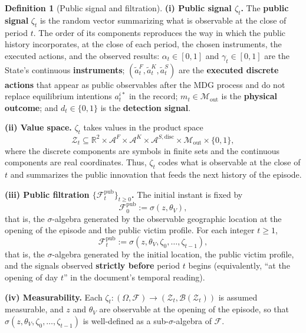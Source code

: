 \documentclass[12pt,a4paper]{article}
\theoremstyle{plain}
\theoremstyle{definition}
\newtheorem{definition}[theorem]{Definition}
\theoremstyle{remark}
\newcommand{\1}{\mathbf{1}}
\begin{document}
\begin{definition}[Public signal and filtration]
\label{def:zeta-filtration}
\noindent\textbf{\textup{(i)} Public signal $\zeta_t$.}\quad
The \textbf{public signal} $\zeta_t$ is the random vector summarizing what is observable
at the close of period $t$. The order of its components reproduces the way in which the
public history incorporates, at the close of each period, the chosen instruments, the
executed actions, and the observed results: $\alpha_t\in[0,1]$ and $\gamma_t\in[0,1]$
are the State's continuous \textbf{instruments}; $(\tilde{a}_t^F,\tilde{a}_t^K,
\tilde{a}_t^S)$ are the \textbf{executed discrete actions} that appear as public
observables after the MDG process and do not replace equilibrium intentions
$a_t^{i\ast}$ in the record; $m_t\in\mathcal{M}_{\mathrm{out}}$ is the
\textbf{physical outcome}; and $d_t\in\{0,1\}$ is the \textbf{detection signal}.

\medskip
\noindent\textbf{\textup{(ii)} Value space.}\quad
$\zeta_t$ takes values in the product space
\[
\mathcal{Z}_t \subseteq \mathbb{R}^2 \times \mathcal{A}^F \times \mathcal{A}^K
\times \mathcal{A}^{S,\mathrm{disc}} \times \mathcal{M}_{\mathrm{out}} \times \{0,1\},
\]
where the discrete components are symbols in finite sets and the continuous components
are real coordinates. Thus, $\zeta_t$ codes what is observable at the close of $t$ and
summarizes the public innovation that feeds the next history of the episode.

\medskip
\noindent\textbf{\textup{(iii)} Public filtration
$\{\mathcal{F}_t^{\mathrm{pub}}\}_{t\ge0}$.}\quad
The initial instant is fixed by
\[
\mathcal{F}_0^{\mathrm{pub}}:=\sigma(z,\theta_V),
\]
that is, the $\sigma$-algebra generated by the observable geographic location at the
opening of the episode and the public victim profile. For each integer $t\ge1$,
\[
\mathcal{F}_t^{\mathrm{pub}}:=\sigma(z,\theta_V,\zeta_0,\ldots,\zeta_{t-1}),
\]
that is, the $\sigma$-algebra generated by the initial location, the public victim
profile, and the signals observed \textbf{strictly before} period $t$ begins
\textup{(equivalently, ``at the opening of day $t$'' in the document's temporal
reading)}.

\medskip
\noindent\textbf{\textup{(iv)} Measurability.}\quad
Each $\zeta_t:(\Omega,\mathcal{F})\to(\mathcal{Z}_t,\mathcal{B}(\mathcal{Z}_t))$ is
assumed measurable, and $z$ and $\theta_V$ are observable at the opening of the episode,
so that $\sigma(z,\theta_V,\zeta_0,\ldots,\zeta_{t-1})$ is well-defined as a
sub-$\sigma$-algebra of $\mathcal{F}$.
\end{definition}
\end{document}
